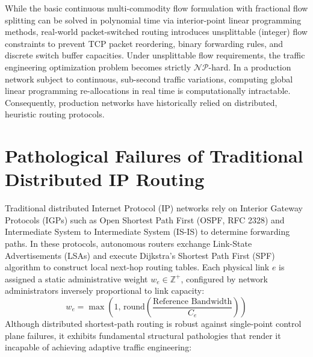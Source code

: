 While the basic continuous multi-commodity flow formulation with fractional flow splitting can be solved in polynomial time via interior-point linear programming methods, real-world packet-switched routing introduces unsplittable (integer) flow constraints to prevent TCP packet reordering, binary forwarding rules, and discrete switch buffer capacities. Under unsplittable flow requirements, the traffic engineering optimization problem becomes strictly $\mathcal{NP}$-hard. In a production network subject to continuous, sub-second traffic variations, computing global linear programming re-allocations in real time is computationally intractable. Consequently, production networks have historically relied on distributed, heuristic routing protocols.

\section{Pathological Failures of Traditional Distributed IP Routing}
Traditional distributed Internet Protocol (IP) networks rely on Interior Gateway Protocols (IGPs) such as Open Shortest Path First (OSPF, RFC 2328) and Intermediate System to Intermediate System (IS-IS) to determine forwarding paths. In these protocols, autonomous routers exchange Link-State Advertisements (LSAs) and execute Dijkstra's Shortest Path First (SPF) algorithm to construct local next-hop routing tables. Each physical link $e$ is assigned a static administrative weight $w_e \in \mathbb{Z}^+$, configured by network administrators inversely proportional to link capacity:
\begin{equation}
    w_e = \max\left(1, \, \text{round}\left(\frac{\text{Reference Bandwidth}}{C_e}\right)\right)
\end{equation}
Although distributed shortest-path routing is robust against single-point control plane failures, it exhibits fundamental structural pathologies that render it incapable of achieving adaptive traffic engineering:

